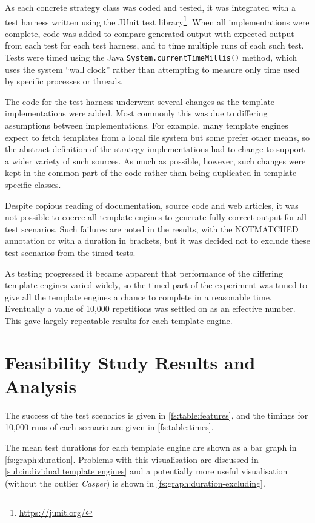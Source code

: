 As each concrete strategy class was coded and tested, it was integrated with a test harness written using the JUnit test library\footnote{\url{https://junit.org/}}. When all implementations were complete, code was added to compare generated output with expected output from each test for each test harness, and to time multiple runs of each such test. Tests were timed using the Java \texttt{System.currentTimeMillis()} method, which uses the system \enquote{wall clock} rather than attempting to measure only time used by specific processes or threads.

The code for the test harness underwent several changes as the template implementations were added. Most commonly this was due to differing assumptions between implementations. For example, many \gls{template engine}s expect to fetch templates from a local file system but some prefer other means, so the abstract definition of the strategy implementations had to change to support a wider variety of such sources. As much as possible, however, such changes were kept in the common part of the code rather than being duplicated in template-specific classes.

\label{A154}
Despite copious reading of documentation, source code and web articles, it was not possible to coerce all \gls{template engine}s to generate fully correct output for all test scenarios. Such failures are noted in the results, with the NOTMATCHED annotation or with a duration in brackets, but it was decided not to exclude these test scenarios from the timed tests.

As testing progressed it became apparent that performance of the differing \gls{template engine}s varied widely, so the timed part of the experiment was tuned to give all the \gls{template engine}s a chance to complete in a reasonable time. Eventually a value of 10,000 repetitions was settled on as an effective number. This gave largely repeatable results for each \gls{template engine}.

\section{Feasibility Study Results and Analysis}
\label{fs:results}

The success of the test scenarios is given in \autoref{fs:table:features}, and the timings for 10,000 runs of each scenario are given in \autoref{fs:table:times}.

The mean test durations for each template engine are shown as a bar graph in \autoref{fs:graph:duration}. Problems with this visualisation are discussed in \autoref{sub:individual template engines} and a potentially more useful visualisation (without the outlier \emph{Casper}) is shown in \autoref{fs:graph:duration-excluding}.

